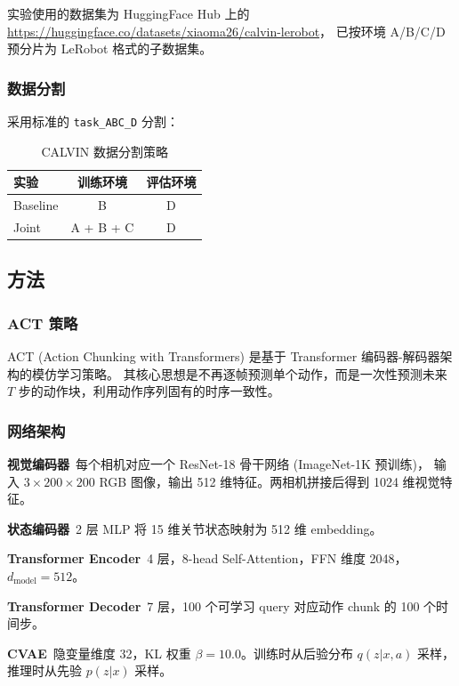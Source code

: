 \documentclass[12pt,a4paper]{ctexart}
\begin{document}
实验使用的数据集为 HuggingFace Hub 上的 \url{https://huggingface.co/datasets/xiaoma26/calvin-lerobot}，
已按环境 A/B/C/D 预分片为 LeRobot 格式的子数据集。

\subsubsection{数据分割}

采用标准的 \texttt{task\_ABC\_D} 分割：

\begin{table}[H]
\centering
\caption{CALVIN 数据分割策略}
\begin{tabular}{@{}lcc@{}}
\toprule
\textbf{实验} & \textbf{训练环境} & \textbf{评估环境} \\
\midrule
Baseline & B         & D \\
Joint    & A + B + C & D \\
\bottomrule
\end{tabular}
\end{table}

\subsection{方法}

\subsubsection{ACT 策略}

ACT (Action Chunking with Transformers) 是基于 Transformer 编码器-解码器架构的模仿学习策略\cite{zhao2023act}。
其核心思想是不再逐帧预测单个动作，而是一次性预测未来 $T$ 步的动作块，利用动作序列固有的时序一致性。

\subsubsection{网络架构}

\textbf{视觉编码器}\ 每个相机对应一个 ResNet-18 骨干网络 (ImageNet-1K 预训练)，
输入 $3\times 200 \times 200$ RGB 图像，输出 512 维特征。两相机拼接后得到 1024 维视觉特征。

\textbf{状态编码器}\ 2 层 MLP 将 15 维关节状态映射为 512 维 embedding。

\textbf{Transformer Encoder}\ 4 层，8-head Self-Attention，FFN 维度 2048，$d_{\text{model}} = 512$。

\textbf{Transformer Decoder}\ 7 层，100 个可学习 query 对应动作 chunk 的 100 个时间步。

\textbf{CVAE}\ 隐变量维度 32，KL 权重 $\beta = 10.0$。训练时从后验分布 $q(z|x,a)$ 采样，推理时从先验 $p(z|x)$ 采样。
\end{document}
